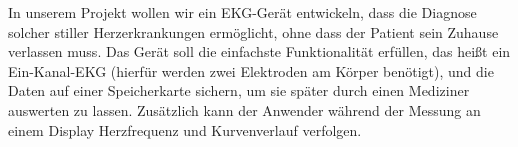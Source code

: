 In unserem Projekt wollen wir ein EKG-Gerät entwickeln, dass die Diagnose solcher stiller Herzerkrankungen ermöglicht, ohne dass der Patient sein Zuhause verlassen muss. Das Gerät soll die einfachste Funktionalität erfüllen, das heißt ein Ein-Kanal-EKG (hierfür werden zwei Elektroden am Körper benötigt), und die Daten auf einer Speicherkarte sichern, um sie später durch einen Mediziner auswerten zu lassen. Zusätzlich kann der Anwender während der Messung an einem Display Herzfrequenz und Kurvenverlauf verfolgen. 





